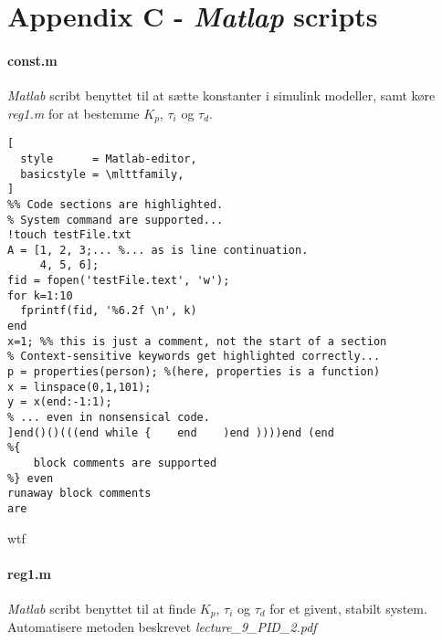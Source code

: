 \section*{Appendix C - \emph{Matlap} scripts}
\paragraph{ const.m }
	\emph{Matlab} scribt benyttet til at sætte konstanter i simulink modeller, samt
	køre \emph{reg1.m} for at bestemme $K_p$, $\tau_i$ og $\tau_d$.

\begin{lstlisting}[
  style      = Matlab-editor,
  basicstyle = \mlttfamily,
]
%% Code sections are highlighted.
% System command are supported...
!touch testFile.txt
A = [1, 2, 3;... %... as is line continuation.
     4, 5, 6];
fid = fopen('testFile.text', 'w');
for k=1:10
  fprintf(fid, '%6.2f \n', k)
end
x=1; %% this is just a comment, not the start of a section
% Context-sensitive keywords get highlighted correctly...
p = properties(person); %(here, properties is a function)
x = linspace(0,1,101);
y = x(end:-1:1);
% ... even in nonsensical code.
]end()()(((end while {    end    )end ))))end (end
%{
    block comments are supported
%} even
runaway block comments
are
\end{lstlisting}
%
	wtf
\paragraph{ reg1.m }
	\emph{Matlab} scribt benyttet til at finde $K_p$, $\tau_i$ og $\tau_d$ for et
	givent, stabilt system. Automatisere metoden beskrevet
	\emph{lecture\_9\_PID\_2.pdf}


